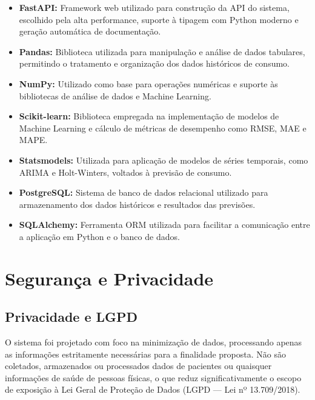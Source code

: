 \documentclass[12pt,a4paper]{article}
\begin{document}
\begin{itemize}
    \item \textbf{FastAPI:} Framework web utilizado para construção da API do sistema, escolhido pela alta performance, suporte à tipagem com Python moderno e geração automática de documentação.
\end{itemize}

\begin{itemize}
    \item \textbf{Pandas:} Biblioteca utilizada para manipulação e análise de dados tabulares, permitindo o tratamento e organização dos dados históricos de consumo.
    \item \textbf{NumPy:} Utilizado como base para operações numéricas e suporte às bibliotecas de análise de dados e Machine Learning.
    \item \textbf{Scikit-learn:} Biblioteca empregada na implementação de modelos de Machine Learning e cálculo de métricas de desempenho como RMSE, MAE e MAPE.
    \item \textbf{Statsmodels:} Utilizada para aplicação de modelos de séries temporais, como ARIMA e Holt-Winters, voltados à previsão de consumo.
\end{itemize}

\begin{itemize}
    \item \textbf{PostgreSQL:} Sistema de banco de dados relacional utilizado para armazenamento dos dados históricos e resultados das previsões.
    \item \textbf{SQLAlchemy:} Ferramenta ORM utilizada para facilitar a comunicação entre a aplicação em Python e o banco de dados.
\end{itemize}

\section{Segurança e Privacidade}
\subsection{Privacidade e LGPD}

O sistema foi projetado com foco na minimização de dados, processando 
apenas as informações estritamente necessárias para a finalidade proposta. 
Não são coletados, armazenados ou processados dados de pacientes ou 
quaisquer informações de saúde de pessoas físicas, o que reduz 
significativamente o escopo de exposição à Lei Geral de Proteção de Dados 
(LGPD — Lei nº 13.709/2018).
\end{document}
